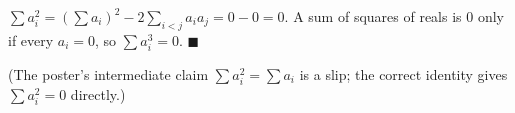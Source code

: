 $\sum a_i^2=\left(\sum a_i\right)^2-2\sum_{i<j}a_ia_j=0-0=0$. A sum of squares of reals is $0$ only if every $a_i=0$, so $\sum a_i^3=0$. $\blacksquare$

(The poster's intermediate claim $\sum a_i^2=\sum a_i$ is a slip; the correct identity gives $\sum a_i^2=0$ directly.)
